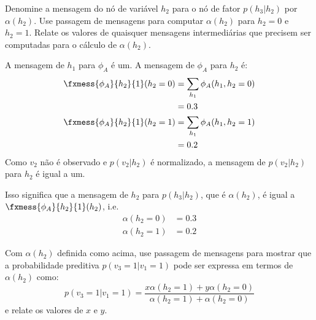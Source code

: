 \begin{exenumerate}
    \item Denomine a mensagem do n\'o de vari\'avel $h_2$ para o n\'o de fator $p(h_3 |
    h_2)$ por $\alpha(h_2)$. Use passagem de mensagens para computar $\alpha(h_2)$
    para $h_2=0$ e $h_2=1$. Relate os valores de quaisquer mensagens intermedi\'arias
    que precisem ser computadas para o c\'alculo de $\alpha(h_2)$.
    
    \begin{solution}
        A mensagem de $h_1$ para $\phi_A$ \'e um. A mensagem de
        $\phi_A$ para $h_2$ \'e:
        \begin{align}
            \fxmess{\phi_A}{h_2}{1}(h_2=0) & = \sum_{h_1} \phi_A(h_1, h_2=0)\\
            & = 0.3\\
            \fxmess{\phi_A}{h_2}{1}(h_2=1) & = \sum_{h_1} \phi_A(h_1, h_2=1)\\
            & = 0.2
        \end{align}
        Como $v_2$ n\~ao \'e observado e $p(v_2|h_2)$ \'e normalizado, a mensagem de $p(v_2|h_2)$ para $h_2$ \'e igual a um.
        
        Isso significa que a mensagem de $h_2$ para $p(h_3 | h_2)$, que \'e
        $\alpha(h_2)$, \'e igual a $\fxmess{\phi_A}{h_2}{1}(h_2)$, i.e.\ 
        \begin{align}
            \alpha(h_2=0) & = 0.3\\
            \alpha(h_2=1) & = 0.2
        \end{align}
    \end{solution}
    
    \item Com $\alpha(h_2)$ definida como acima, use passagem de mensagens para mostrar
    que a probabilidade preditiva $p(v_3=1 | v_1=1)$ pode ser expressa em termos de $\alpha(h_2)$
    como:
    \begin{equation}
        p(v_3=1 | v_1=1) = \frac{ x \alpha(h_2=1) + y \alpha(h_2=0)}{\alpha(h_2=1)+\alpha(h_2=0)}
    \end{equation}
    e relate os valores de $x$ e $y$.  
    

\end{exenumerate}
